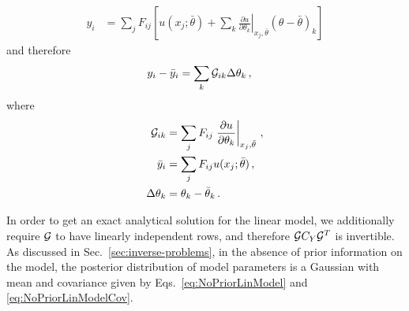 \begin{align}
    y_i  &= 
        \sum_j F_{ij} \left[u(x_j; \bar\theta)
         + \sum_k \left.\frac{\partial u}{\partial \theta_k}\right|_{x_j,\bar\theta} 
         \left(\theta - \bar\theta\right)_k
        \right]
\end{align}
and therefore
\begin{align}
    y_i - \bar{y}_i &=
         \sum_k \mathcal{G}_{ik} \Delta\theta_k
        \,,         
\end{align}
where 
\begin{align}
    \mathcal{G}_{ik} &= 
        \sum_j F_{ij} \left.\frac{\partial u}{\partial \theta_k}\right|_{x_j,\bar\theta}\, , \\
    \bar{y}_i &= \sum_j F_{ij} u(x_j; \bar\theta)\, , \\
    \Delta\theta_k &= \theta_k - \bar\theta_k\, .
\end{align}

In order to get an exact analytical solution for the linear model, we
additionally require $\mathcal{G}$ to have linearly independent rows, and therefore
$\mathcal{G} C_{Y} \mathcal{G}^T$ is invertible. As discussed in
Sec.~\ref{sec:inverse-problems}, in the absence of prior information on the
model, the posterior distribution of model parameters is a Gaussian with mean
and covariance given by Eqs.~\ref{eq:NoPriorLinModel} and
\ref{eq:NoPriorLinModelCov}.

